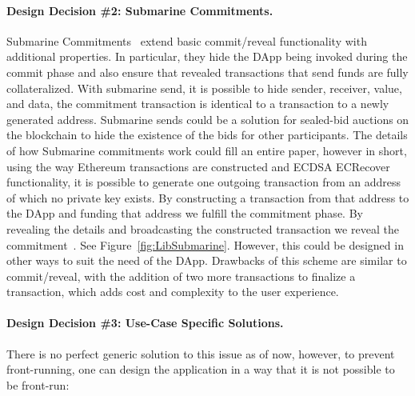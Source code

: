 \paragraph{Design Decision \#2: Submarine Commitments.}\label{submarineCommits}
Submarine Commitments~\cite{breidenbach2018enter, submarinesendHD} extend basic commit/reveal functionality with additional properties. In particular, they hide the DApp being invoked during the commit phase and also ensure that revealed transactions that send funds are fully collateralized. With submarine send, it is possible to hide sender, receiver, value, and data, the commitment transaction is identical to a transaction to a newly generated address. Submarine sends could be a solution for sealed-bid auctions on the blockchain to hide the existence of the bids for other participants. The details of how Submarine commitments work could fill an entire paper, however in short, using the way Ethereum transactions are constructed and ECDSA ECRecover functionality, it is possible to generate one outgoing transaction from an address of which no private key exists. By constructing a transaction from that address to the DApp and funding that address we fulfill the commitment phase. By revealing the details and broadcasting the constructed transaction we reveal the commitment~\cite{libsubmarine}. See Figure~\ref{fig:LibSubmarine}. However, this could be designed in other ways to suit the need of the DApp. Drawbacks of this scheme are similar to commit/reveal, with the addition of two more transactions to finalize a transaction, which adds cost and complexity to the user experience.

\paragraph{Design Decision \#3: Use-Case Specific Solutions.}
There is no perfect generic solution to this issue as of now, however, to prevent front-running, one can design the application in a way that it is not possible to be front-run:

